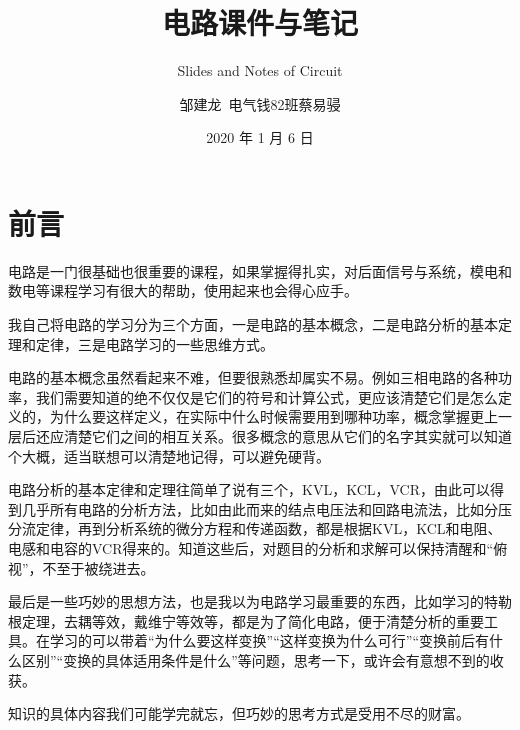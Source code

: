 \documentclass[
  10pt,
  twoside,
  openany,
  b5paper, %
  colorscheme = basic, %
]{qyxf-book}
\title{电路课件与笔记}
\subtitle{Slides and Notes of Circuit}  %
\author{邹建龙\ 电气钱82班蔡易骎}
\date{2020 年 1 月 6 日}
\begin{document}
\maketitle

\chapter*{前言}
\thispagestyle{empty}

电路是一门很基础也很重要的课程，如果掌握得扎实，对后面信号与系统，模电和数电等课程学习有很大的帮助，使用起来也会得心应手。

我自己将电路的学习分为三个方面，一是电路的基本概念，二是电路分析的基本定理和定律，三是电路学习的一些思维方式。

电路的基本概念虽然看起来不难，但要很熟悉却属实不易。例如三相电路的各种功率，我们需要知道的绝不仅仅是它们的符号和计算公式，更应该清楚它们是怎么定义的，为什么要这样定义，在实际中什么时候需要用到哪种功率，概念掌握更上一层后还应清楚它们之间的相互关系。很多概念的意思从它们的名字其实就可以知道个大概，适当联想可以清楚地记得，可以避免硬背。

电路分析的基本定律和定理往简单了说有三个，KVL，KCL，VCR，由此可以得到几乎所有电路的分析方法，比如由此而来的结点电压法和回路电流法，比如分压分流定律，再到分析系统的微分方程和传递函数，都是根据KVL，KCL和电阻、电感和电容的VCR得来的。知道这些后，对题目的分析和求解可以保持清醒和“俯视”，不至于被绕进去。

最后是一些巧妙的思想方法，也是我以为电路学习最重要的东西，比如学习的特勒根定理，去耦等效，戴维宁等效等，都是为了简化电路，便于清楚分析的重要工具。在学习的可以带着“为什么要这样变换”“这样变换为什么可行”“变换前后有什么区别”“变换的具体适用条件是什么”等问题，思考一下，或许会有意想不到的收获。

知识的具体内容我们可能学完就忘，但巧妙的思考方式是受用不尽的财富。


\newpage
\tableofcontents
\end{document}
